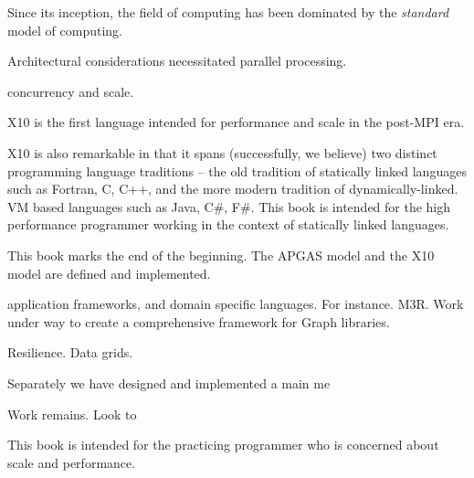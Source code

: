 
Since its inception, the field of computing has been dominated by the
{\em standard} model of computing. 

Architectural considerations necessitated parallel
processing. 

concurrency and scale.


X10 is the first language intended for performance and scale in the
post-MPI era.  

X10 is also remarkable in that it spans (successfully, we believe) two
distinct programming language traditions -- the old tradition of
statically linked languages such as Fortran, C, C++, and the more
modern tradition of dynamically-linked. VM based languages such as
Java, C\#, F\#.   This book is intended for the high performance
programmer working in the context of statically linked languages.


This book marks the end of the beginning. The APGAS model and the X10
model are defined and implemented. 

application frameworks, and domain specific languages.  For
instance. M3R. Work under way to create a comprehensive framework for
Graph libraries.

Resilience.
Data grids.

Separately we have designed and implemented a main me

Work remains. Look to 




This book is intended for the practicing programmer who is concerned
about scale and performance.   

